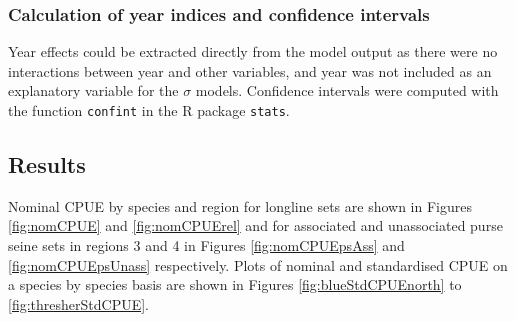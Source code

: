 \subsubsection{Calculation of year indices and confidence intervals}
Year effects could be extracted directly from the model output as there were no interactions between year and other variables, and year was not included as an explanatory variable for the $\sigma$ models. Confidence intervals were computed with the function \texttt{confint} in the R package \texttt{stats}.

\clearpage
\subsection{Results}

Nominal CPUE by species and region for longline sets are shown in Figures \ref{fig:nomCPUE} and \ref{fig:nomCPUErel} and for associated and unassociated purse seine sets in regions 3 and 4 in Figures \ref{fig:nomCPUEpsAss} and \ref{fig:nomCPUEpsUnass} respectively. Plots of nominal and standardised CPUE on a species by species basis are shown in Figures \ref{fig:blueStdCPUEnorth} to \ref{fig:thresherStdCPUE}.
 
